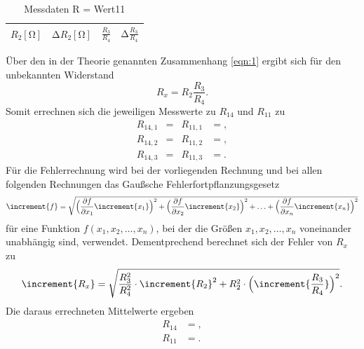 \begin{table}
  \centering
  \caption{Messdaten R = Wert11}
  \label{tab:2}
  \begin{tabular}{c c c c}
    \toprule
    {$R_2 [\si{\ohm}]$} & {$\increment R_2 [\si{\ohm}]$} & {$\frac{R_3}{R_4}$} & {$\increment \frac{R_3}{R_4}$} \\
    \midrule
    
    \bottomrule
  \end{tabular}
\end{table}
Über den in der Theorie genannten Zusammenhang \ref{eqn:1} ergibt sich für den unbekannten Widerstand
\begin{equation}
  R_x = R_2 \frac{R_3}{R_4}.
\end{equation}
Somit errechnen sich die jeweiligen Messwerte zu $R_{14}$ und $R_{11}$ zu
\begin{align*}
  R_{14,1}   &=  & R_{11,1} &= ,\\
  R_{14,2}   &=  & R_{11,2} &= ,\\
  R_{14,3}   &=  & R_{11,3} &= .
\end{align*}
Für die Fehlerrechnung wird bei der vorliegenden Rechnung und bei allen folgenden Rechnungen das Gaußsche Fehlerfortpflanzungsgesetz
\begin{equation}
\increment{f} = \sqrt{\Bigl(\frac{\partial f}{\partial x_1}\increment{x_1}\Bigr)^2 + \Bigl(\frac{\partial f}{\partial x_2}\increment{x_2}\Bigr)^2 + \dotsc + \Bigl(\frac{\partial f}{\partial x_n}\increment{x_n}\Bigr)^2}
\end{equation}
für eine Funktion $f(x_1,x_2, \dotsc ,x_n)$, bei der die Größen $x_1, x_2, \dotsc , x_n$ voneinander unabhängig sind, verwendet.
Dementprechend berechnet sich der Fehler von $R_x$ zu
\begin{equation}
\increment{R_x} = \sqrt{\frac{R_3^2}{R_4^2} \cdot \increment{R_2}^2 + R_2^2 \cdot \Bigl(\increment{\frac{R_3}{R_4} }\Bigr)^2}.
  \label{eqn:fehler1}
\end{equation}
Die daraus errechneten Mittelwerte ergeben
\begin{align*}
  R_{14}   &= ,\\
  R_{11}   &= .
\end{align*}

